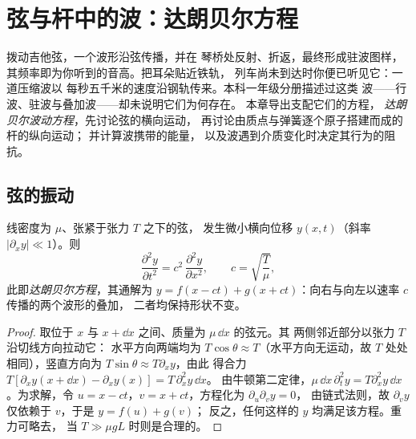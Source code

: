 \chapter{弦与杆中的波：达朗贝尔方程}\label{ch:b2:waves-on-strings}

拨动吉他弦，一个波形沿弦传播，并在
琴桥处反射、折返，最终形成驻波图样，
其频率即为你听到的音高。把耳朵贴近铁轨，
列车尚未到达时你便已听见它：一道压缩波以
每秒五千米的速度沿钢轨传来。本科一年级分册描述过这类
波——行波、驻波与叠加波——却未说明它们为何存在。
本章导出支配它们的方程，
\emph{达朗贝尔波动方程}，先讨论弦的横向运动，
再讨论由质点与弹簧逐个原子搭建而成的杆的纵向运动；
并计算波携带的能量，
以及波遇到介质变化时决定其行为的阻抗。

\section{弦的振动}

\begin{theorem}[弦的波动方程]\label{thm:b2:waves-on-strings:equation}
线密度为 $\mu$、张紧于张力 $T$ 之下的弦，
发生微小横向位移 $y(x, t)$（斜率 $|\partial_xy| \ll 1$）。则
\[
\frac{\partial^2y}{\partial t^2} = c^2\,\frac{\partial^2y}{\partial x^2} ,
\qquad c = \sqrt{\frac{T}{\mu}} ,
\]
此即\emph{达朗贝尔方程}，其通解为 $y = f(x - ct)
+ g(x + ct)$：向右与向左以速率 $c$ 传播的两个波形的叠加，
二者均保持形状不变。
\end{theorem}

\begin{proof}
取位于 $x$ 与 $x + \dd x$ 之间、质量为 $\mu\,\dd x$ 的弦元。其
两侧邻近部分以张力 $T$ 沿切线方向拉动它：
水平方向两端均为 $T\cos\theta \approx T$（水平方向无运动，故
$T$ 处处相同），竖直方向为 $T\sin\theta \approx T\partial_xy$，由此
得合力 $T[\partial_xy(x + \dd x) - \partial_xy(x)] = T\,\partial_x^2y\,\dd x$。
由牛顿第二定律，$\mu\,\dd x\,\partial_t^2y = T\partial_x^2y\,\dd x$。为求解，令
$u = x - ct$，$v = x + ct$，方程化为 $\partial_u\partial_vy = 0$，
由链式法则，故 $\partial_vy$ 仅依赖于 $v$，于是 $y = f(u) + g(v)$；
反之，任何这样的 $y$ 均满足该方程。重力可略去，
当 $T \gg \mu gL$ 时则是合理的。
\end{proof}

